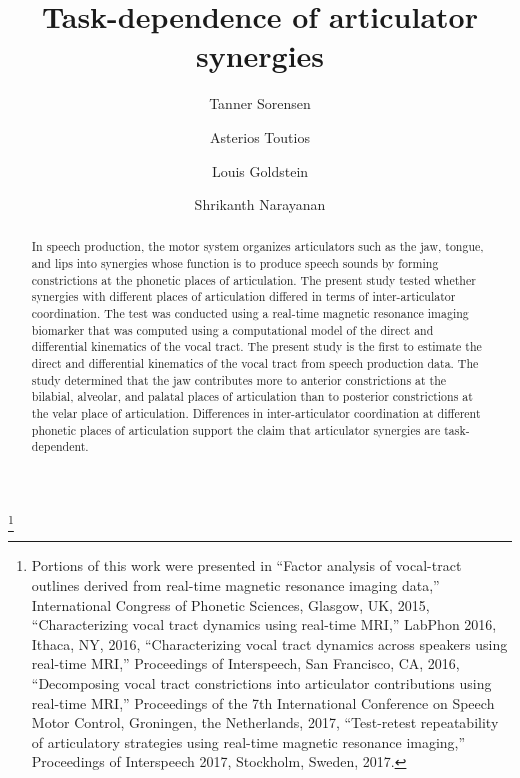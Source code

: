 \documentclass[preprint]{JASAnew}
\begin{document}
\title[Task dependence of articulator synergies]{Task-dependence of articulator synergies}

\thanks{Portions of this work were presented in 
``Factor analysis of vocal-tract outlines derived from real-time magnetic resonance imaging data,'' International Congress of Phonetic Sciences, Glasgow, UK, 2015,
``Characterizing vocal tract dynamics using real-time MRI,'' LabPhon 2016, Ithaca, NY, 2016,
``Characterizing vocal tract dynamics across speakers using real-time MRI,'' Proceedings of Interspeech, San Francisco, CA, 2016, 
``Decomposing vocal tract constrictions into articulator contributions using real-time MRI,'' Proceedings of the 7th International Conference on Speech Motor Control, Groningen, the Netherlands, 2017,
``Test-retest repeatability of articulatory strategies using real-time magnetic resonance imaging,'' Proceedings of Interspeech 2017, Stockholm, Sweden, 2017.}

\author{Tanner Sorensen}

\author{Asterios Toutios}

\author{Louis Goldstein}

\author{Shrikanth Narayanan}

\begin{abstract}
In speech production, the motor system organizes articulators such as the jaw, tongue, and lips into synergies whose function is to produce speech sounds by forming constrictions at the phonetic places of articulation.
%
The present study tested whether synergies with different places of articulation differed in terms of inter-articulator coordination.
%
The test was conducted using a real-time magnetic resonance imaging biomarker that was computed using a computational model of the direct and differential kinematics of the vocal tract. 
%
The present study is the first to estimate the direct and differential kinematics of the vocal tract from speech production data.
%
The study determined that the jaw contributes more to anterior constrictions at the bilabial, alveolar, and palatal places of articulation than to posterior constrictions at the velar place of articulation. 
%
Differences in inter-articulator coordination at different phonetic places of articulation support the claim that articulator synergies are task-dependent.
\end{abstract}
\end{document}
